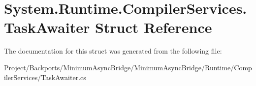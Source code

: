 \hypertarget{struct_system_1_1_runtime_1_1_compiler_services_1_1_task_awaiter}{}\section{System.\+Runtime.\+Compiler\+Services.\+Task\+Awaiter Struct Reference}
\label{struct_system_1_1_runtime_1_1_compiler_services_1_1_task_awaiter}


The documentation for this struct was generated from the following file\+:\begin{DoxyCompactItemize}
\item 
Project/\+Backports/\+Minimum\+Async\+Bridge/\+Minimum\+Async\+Bridge/\+Runtime/\+Compiler\+Services/Task\+Awaiter.\+cs\end{DoxyCompactItemize}
